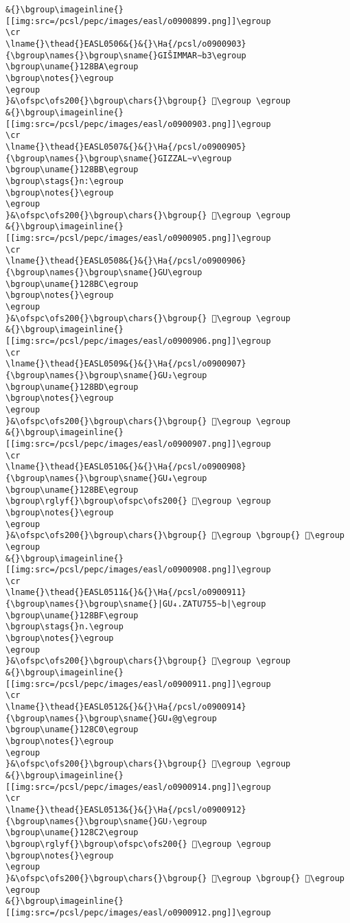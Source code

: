 \begin{verbatim}
&{}\bgroup\imageinline{}[[img:src=/pcsl/pepc/images/easl/o0900899.png]]\egroup
\cr
\lname{}\thead{}EASL0506&{}&{}\Ha{/pcsl/o0900903}{\bgroup\names{}\bgroup\sname{}GIŠIMMAR∼b3\egroup
\bgroup\uname{}128BA\egroup
\bgroup\notes{}\egroup
\egroup
}&\ofspc\ofs200{}\bgroup\chars{}\bgroup{} 𒢺\egroup \egroup
&{}\bgroup\imageinline{}[[img:src=/pcsl/pepc/images/easl/o0900903.png]]\egroup
\cr
\lname{}\thead{}EASL0507&{}&{}\Ha{/pcsl/o0900905}{\bgroup\names{}\bgroup\sname{}GIZZAL∼v\egroup
\bgroup\uname{}128BB\egroup
\bgroup\stags{}n:\egroup
\bgroup\notes{}\egroup
\egroup
}&\ofspc\ofs200{}\bgroup\chars{}\bgroup{} 𒢻\egroup \egroup
&{}\bgroup\imageinline{}[[img:src=/pcsl/pepc/images/easl/o0900905.png]]\egroup
\cr
\lname{}\thead{}EASL0508&{}&{}\Ha{/pcsl/o0900906}{\bgroup\names{}\bgroup\sname{}GU\egroup
\bgroup\uname{}128BC\egroup
\bgroup\notes{}\egroup
\egroup
}&\ofspc\ofs200{}\bgroup\chars{}\bgroup{} 𒢼\egroup \egroup
&{}\bgroup\imageinline{}[[img:src=/pcsl/pepc/images/easl/o0900906.png]]\egroup
\cr
\lname{}\thead{}EASL0509&{}&{}\Ha{/pcsl/o0900907}{\bgroup\names{}\bgroup\sname{}GU₂\egroup
\bgroup\uname{}128BD\egroup
\bgroup\notes{}\egroup
\egroup
}&\ofspc\ofs200{}\bgroup\chars{}\bgroup{} 𒢽\egroup \egroup
&{}\bgroup\imageinline{}[[img:src=/pcsl/pepc/images/easl/o0900907.png]]\egroup
\cr
\lname{}\thead{}EASL0510&{}&{}\Ha{/pcsl/o0900908}{\bgroup\names{}\bgroup\sname{}GU₄\egroup
\bgroup\uname{}128BE\egroup
\bgroup\rglyf{}\bgroup\ofspc\ofs200{} 𒢾\egroup \egroup
\bgroup\notes{}\egroup
\egroup
}&\ofspc\ofs200{}\bgroup\chars{}\bgroup{} 𒣁\egroup \bgroup{} 𒢾\egroup \egroup
&{}\bgroup\imageinline{}[[img:src=/pcsl/pepc/images/easl/o0900908.png]]\egroup
\cr
\lname{}\thead{}EASL0511&{}&{}\Ha{/pcsl/o0900911}{\bgroup\names{}\bgroup\sname{}|GU₄.ZATU755∼b|\egroup
\bgroup\uname{}128BF\egroup
\bgroup\stags{}n.\egroup
\bgroup\notes{}\egroup
\egroup
}&\ofspc\ofs200{}\bgroup\chars{}\bgroup{} 𒢿\egroup \egroup
&{}\bgroup\imageinline{}[[img:src=/pcsl/pepc/images/easl/o0900911.png]]\egroup
\cr
\lname{}\thead{}EASL0512&{}&{}\Ha{/pcsl/o0900914}{\bgroup\names{}\bgroup\sname{}GU₄@g\egroup
\bgroup\uname{}128C0\egroup
\bgroup\notes{}\egroup
\egroup
}&\ofspc\ofs200{}\bgroup\chars{}\bgroup{} 𒣀\egroup \egroup
&{}\bgroup\imageinline{}[[img:src=/pcsl/pepc/images/easl/o0900914.png]]\egroup
\cr
\lname{}\thead{}EASL0513&{}&{}\Ha{/pcsl/o0900912}{\bgroup\names{}\bgroup\sname{}GU₇\egroup
\bgroup\uname{}128C2\egroup
\bgroup\rglyf{}\bgroup\ofspc\ofs200{} 𒣂\egroup \egroup
\bgroup\notes{}\egroup
\egroup
}&\ofspc\ofs200{}\bgroup\chars{}\bgroup{} 𒣂\egroup \bgroup{} 𒣃\egroup \egroup
&{}\bgroup\imageinline{}[[img:src=/pcsl/pepc/images/easl/o0900912.png]]\egroup

\end{verbatim}
